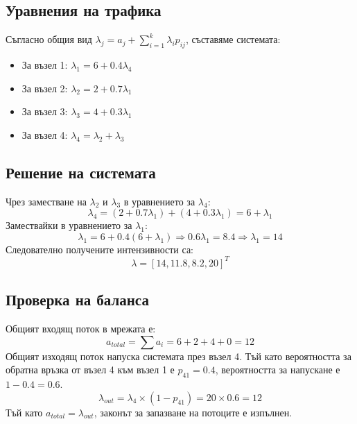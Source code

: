 \subsection{Уравнения на трафика}
Съгласно общия вид $\lambda_{j} = a_{j} + \sum_{i=1}^{k} \lambda_{i} p_{ij}$, съставяме системата:
\begin{itemize}
    \item За възел 1: $\lambda_1 = 6 + 0.4\lambda_4$ 
    \item За възел 2: $\lambda_2 = 2 + 0.7\lambda_1$ 
    \item За възел 3: $\lambda_3 = 4 + 0.3\lambda_1$ 
    \item За възел 4: $\lambda_4 = \lambda_2 + \lambda_3$ 
\end{itemize}

\subsection{Решение на системата}
Чрез заместване на $\lambda_2$ и $\lambda_3$ в уравнението за $\lambda_4$:
\[ \lambda_4 = (2 + 0.7\lambda_1) + (4 + 0.3\lambda_1) = 6 + \lambda_1 \]
Замествайки в уравнението за $\lambda_1$:
\[ \lambda_1 = 6 + 0.4(6 + \lambda_1) \Rightarrow 0.6\lambda_1 = 8.4 \Rightarrow \lambda_1 = 14 \]
Следователно получените интензивности са:
\[ \lambda = [14, 11.8, 8.2, 20]^T \]

\subsection{Проверка на баланса}
Общият входящ поток в мрежата е:
\[ a_{total} = \sum a_i = 6 + 2 + 4 + 0 = 12 \]
Общият изходящ поток напуска системата през възел 4. Тъй като вероятността за обратна връзка от възел 4 към възел 1 е $p_{41} = 0.4$, вероятността за напускане е $1 - 0.4 = 0.6$.
\[ \lambda_{out} = \lambda_4 \times (1 - p_{41}) = 20 \times 0.6 = 12 \]
Тъй като $a_{total} = \lambda_{out}$, законът за запазване на потоците е изпълнен.

